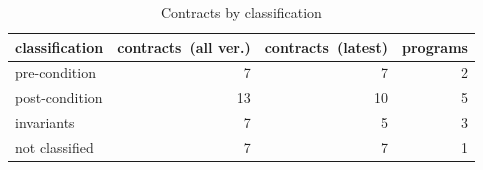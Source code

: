 \begin{table}[]
\centering
\caption{Contracts by classification}
\label{tab:contractsbyclassification}
\begin{tabular}{|p{2.1cm}|r|r|r|} \hline
   classification & \parbox{1.2cm}{contracts\ (all ver.)} & \parbox{1.2cm}{contracts\ (latest)} & programs \\ \hline
	pre-condition &  7 & 
7 & 
2 \\ 
	post-condition &  13 & 
10 & 
5 \\ 
	invariants &  7 & 
5 & 
3 \\ 
	not classified &  7 & 
7 & 
1 \\ 
\hline
\end{tabular}
\end{table}
